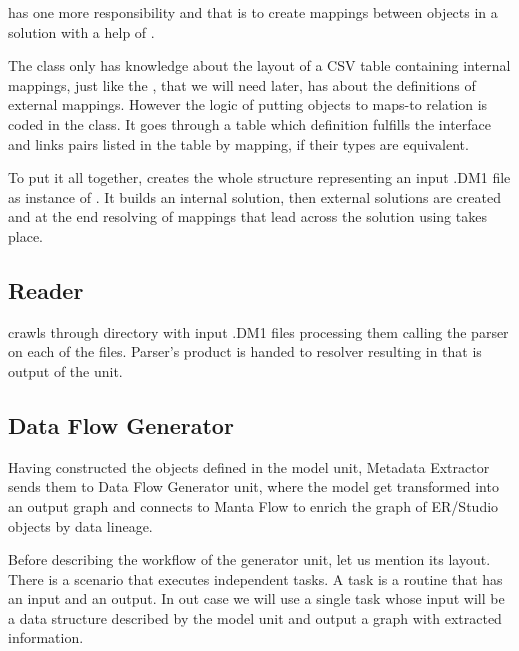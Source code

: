  has one more responsibility and that is to create mappings between  objects in a solution with a help of . 

The   class only has knowledge about the layout of a CSV table containing internal mappings, just like the , that we will need later, has about the definitions of external mappings. However the logic of putting objects to maps-to relation is coded in the  class.
It goes through a table which definition fulfills the interface  and links pairs listed in the table by mapping, if their types are equivalent.



To put it all together,  creates the whole structure representing an input .DM1 file as instance of . It builds an internal solution, then external solutions are created and at the end resolving of mappings that lead across the solution using  takes place.


\subsection{Reader}

 crawls through directory with input .DM1 files processing them calling the parser on each of the files. Parser's product is handed to resolver resulting in  that is output of the unit.

\subsection{Data Flow Generator}

Having constructed the objects defined in the model unit, Metadata Extractor sends them to Data Flow Generator unit, where the model get transformed into an output graph and connects to Manta Flow to enrich the graph of ER/Studio objects by data lineage.

Before describing the workflow of the generator unit, let us mention its layout.
There is a scenario that executes independent tasks. A task is a routine that has an input and an output. In out case we will use a single task whose input will be a data structure described by the model unit and output a graph with extracted information.

